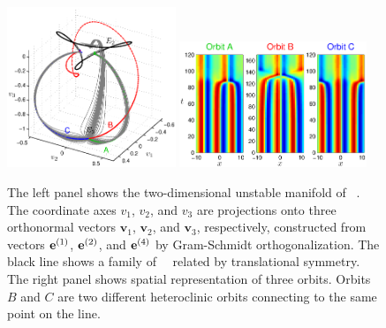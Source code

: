 \begin{figure}[t]
\begin{center}
\includegraphics[width=0.45\textwidth, clip=true]{figs/ks22_E3_manifold.eps}
\includegraphics[width=0.5\textwidth, clip=true]{figs/ks22_E3_orbits_c.eps}
\end{center}
\caption{
The left panel shows the two-dimensional
unstable manifold of \eqv\ . The coordinate axes
$v_1$, $v_2$, and $v_3$ are
projections onto three orthonormal vectors
$\mathbf{v}_1$, $\mathbf{v}_2$, and $\mathbf{v}_3$,
respectively, constructed from vectors
${\mathbf e}^{(1)}$, ${\mathbf e}^{(2)}$, and ${\mathbf e}^{(4)}$ by Gram-Schmidt orthogonalization.
The black line shows a family of ~\eqva\ related by translational
symmetry. The right panel shows spatial representation of
three orbits. Orbits $B$ and $C$ are two different heteroclinic orbits
connecting  to the same point on the  line.
        }
\label{f:KS22E3man}
\end{figure}

